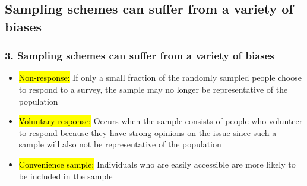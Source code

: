 \documentclass[11pt,containsverbatim,handout,xcolor=xelatex,dvipsnames,table]{beamer}
\begin{document}

\subsection{Sampling schemes can suffer from a variety of biases}
\label{mi3}


\begin{frame}
\frametitle{3. Sampling schemes can suffer from a variety of biases}

\begin{itemize}[<+->]

\item \hl{Non-response:} If only a small fraction of the randomly sampled people choose to respond to a survey, the sample may no longer be representative of the population

\item \hl{Voluntary response:} Occurs when the sample consists of people who volunteer to respond because they have strong opinions on the issue since such a sample will also not be representative of the population

\item \hl{Convenience sample:} Individuals who are easily accessible are more likely to be included in the sample

\end{itemize}

\end{frame}

\end{document}
